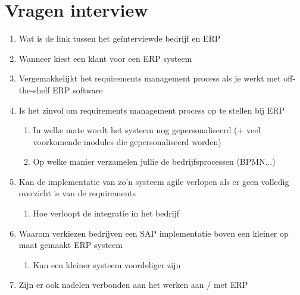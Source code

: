 
\chapter{Vragen interview}
\label{ch:vragen}

\begin{enumerate}
    \item Wat is de link tussen het geïnterviewde bedrijf en ERP
    
    \item Wanneer kiest een klant voor een ERP systeem
    
    \item Vergemakkelijkt het requirements management process als je werkt met off-the-shelf ERP software
     
    \item Is het zinvol om requirements management process op te stellen bij ERP
    
    \begin{enumerate}
        \item In welke mate wordt het systeem nog gepersonaliseerd (+ veel voorkomende modules die gepersonaliseerd worden)
        
        \item Op welke manier verzamelen jullie de bedrijfsprocessen (BPMN...)
    \end{enumerate}

    \item Kan de implementatie van zo'n systeem agile verlopen als er geen volledig overzicht is van de requirements
    
    \begin{enumerate}
        \item Hoe verloopt de integratie in het bedrijf
    \end{enumerate}
    
    \item Waarom verkiezen bedrijven een SAP implementatie boven een kleiner op maat gemaakt ERP systeem
    
    \begin{enumerate}
        \item Kan een kleiner systeem voordeliger zijn
    \end{enumerate}
    
    \item Zijn er ook nadelen verbonden aan het werken aan / met ERP
    

\end{enumerate}
